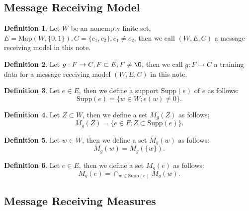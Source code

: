 \documentclass[11pt, a4note]{article}
\theoremstyle{definition}
\newtheorem{definition}{Definition}[section]
\begin{document}
\subsection{Message Receiving Model}

\begin{definition}
Let $ W $ be an nonempty finite set, $ E = \mathrm{Map}(W, \{0, 1\}), C = \{c_{1}, c_{2} \}, c_{1} \ne c_{2} $,
then we call $ (W, E, C) $ a message receiving model in this note.
\end{definition}

\begin{definition}
Let $ g : F \to C, F \subset E, F \ne \O $, then we call $ g : F \to C $
a training data for a message receiving model $ (W, E, C) $ in this note.
\end{definition}

\begin{definition}
Let $ e \in E $, then we define a support $ \mathrm{Supp}(e) $ of $ e $ as follows:
\begin{equation}
\mathrm{Supp}(e) = \{ w \in W ; e(w) \ne 0\}.
\end{equation}
\end{definition}

\begin{definition}
Let $ Z \subset W $, then we define a set $ M_{g}(Z) $ as follows:
\begin{equation}
M_{g}(Z) = \{e \in F ; Z \subset \mathrm{Supp}(e)\}.
\end{equation}
\end{definition}

\begin{definition}
Let $ w \in W $, then we define a set $ M_{g}(w) $ as follows:
\begin{equation}
M_{g}(w) = M_{g}(\{w\}).
\end{equation}
\end{definition}

\begin{definition}
Let $ e \in E $, then we define a set $ M_{g}(e) $ as follows:
\begin{equation}
M_{g}(e) = \cap_{w \in \mathrm{Supp}(e)}M_{g}(w).
\end{equation}
\end{definition}

\subsection{Message Receiving Measures}
\end{document}
